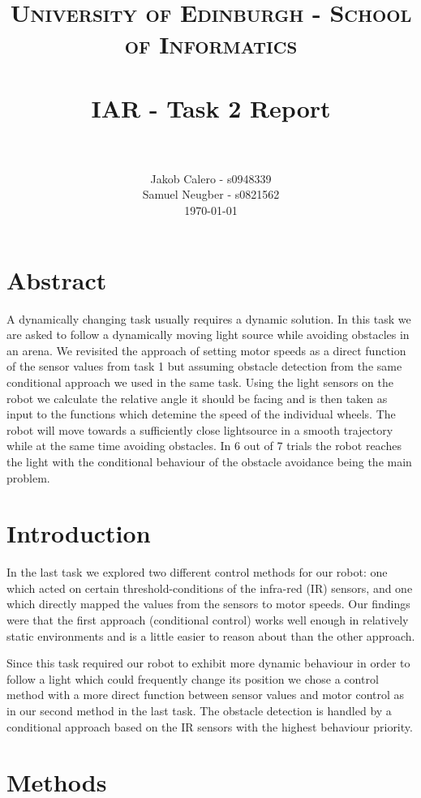 \documentclass[paper=a4, fontsize=12pt]{scrartcl}	%
\title{
\vspace{-1in} 	
\usefont{OT1}{bch}{b}{n}
\normalfont \normalsize \textsc{University of Edinburgh - School of Informatics}
\\ [25pt]
\horrule{0.5pt} \\[0.4cm]
\large IAR - Task 2 Report \\
\horrule{1pt} \\[0.5cm]
}
\author{
  \normalfont \normalsize
  Jakob Calero - s0948339\\[-3pt]\normalsize
  Samuel Neugber - s0821562\\[-3pt]\normalsize
  \today
}
\date{}
\numberwithin{equation}{section}		%
\numberwithin{figure}{section}			%
\numberwithin{table}{section}				%
\begin{document}
\maketitle					%
\section{Abstract}
A dynamically changing task usually requires a dynamic solution. In this task we are asked to follow a dynamically moving light source while avoiding obstacles in an arena. We revisited the approach of setting motor speeds as a direct function of the sensor values from task 1 but assuming obstacle detection from the same conditional approach we used in the same task. Using the light sensors on the robot we calculate the relative angle it should be facing and is then taken as input to the functions which detemine the speed of the individual wheels. The robot will move towards a sufficiently close lightsource in a smooth trajectory while at the same time avoiding obstacles. In 6 out of 7 trials the robot reaches the light with the conditional behaviour of the obstacle avoidance being the main problem.

\section{Introduction}
In the last task we explored two different control methods for our robot: one which acted on certain threshold-conditions of the infra-red (IR) sensors, and one which directly mapped the values from the sensors to motor speeds. Our findings were that the first approach (conditional control) works well enough in relatively static environments and is a little easier to reason about than the other approach.

Since this task required our robot to exhibit more dynamic behaviour in order to follow a light which could frequently change its position we chose a control method with a more direct function between sensor values and motor control as in our second method in the last task. The obstacle detection is handled by a conditional approach based on the IR sensors with the highest behaviour priority.
\section{Methods} 
\end{document}
